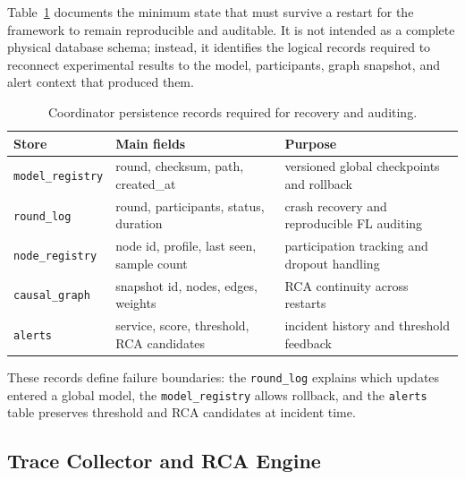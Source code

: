 Table~\ref{tab:persistence_schema} documents the minimum state that must survive
a restart for the framework to remain reproducible and auditable. It is not
intended as a complete physical database schema; instead, it identifies the
logical records required to reconnect experimental results to the model,
participants, graph snapshot, and alert context that produced them.

\begin{table}[H]
    \centering
    \small
    \begin{tabular}{|>{\raggedright\arraybackslash}p{}|
                    >{\raggedright\arraybackslash}p{}|
                    >{\raggedright\arraybackslash}p{}|}
        \hline
        \textbf{Store} & \textbf{Main fields} & \textbf{Purpose} \\
        \hline
        \texttt{model\_registry} & round, checksum, path, created\_at &
        versioned global checkpoints and rollback \\
        \hline
        \texttt{round\_log} & round, participants, status, duration &
        crash recovery and reproducible FL auditing \\
        \hline
        \texttt{node\_registry} & node id, profile, last seen, sample count &
        participation tracking and dropout handling \\
        \hline
        \texttt{causal\_graph} & snapshot id, nodes, edges, weights &
        RCA continuity across restarts \\
        \hline
        \texttt{alerts} & service, score, threshold, RCA candidates &
        incident history and threshold feedback \\
        \hline
    \end{tabular}
    \caption{Coordinator persistence records required for recovery and auditing.}
    \label{tab:persistence_schema}
\end{table}

These records define failure boundaries: the \texttt{round\_log} explains which
updates entered a global model, the \texttt{model\_registry} allows rollback,
and the \texttt{alerts} table preserves threshold and RCA candidates at
incident time.

\subsection{Trace Collector and RCA Engine}
\label{subsec:design_trace_collector}

